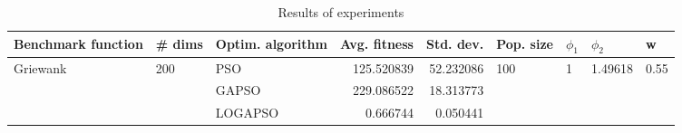 \begin{table}
\centering
\caption{Results of experiments}
\begin{tabular}{lllrrllll}
\toprule
       Benchmark function &              \# dims & Optim. algorithm &  Avg. fitness &  Std. dev. &            Pop. size &         $\phi_{1}$ &               $\phi_{2}$ &                     w \\
\midrule
\multirow{3}{*}{Griewank} & \multirow{3}{*}{200} &              PSO &    125.520839 &  52.232086 & \multirow{3}{*}{100} & \multirow{3}{*}{1} & \multirow{3}{*}{1.49618} & \multirow{3}{*}{0.55} \\
                          &                      &            GAPSO &    229.086522 &  18.313773 &                      &                    &                          &                       \\
                          &                      &          LOGAPSO &      0.666744 &   0.050441 &                      &                    &                          &                       \\
\bottomrule
\end{tabular}
\end{table}

